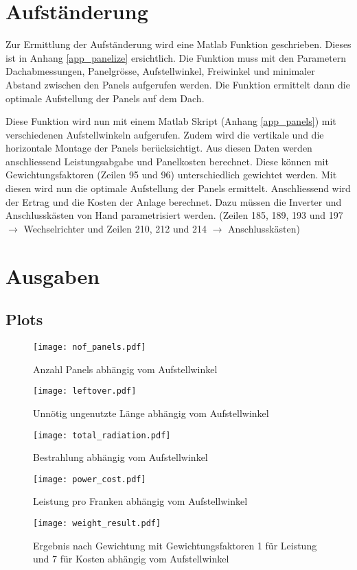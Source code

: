 \documentclass[a4,paper,fleqn]{article}
\begin{document}
\section{Aufständerung}
Zur Ermittlung der Aufständerung wird eine Matlab Funktion geschrieben. Dieses 
ist in Anhang \ref{app_panelize} ersichtlich. Die Funktion muss mit den 
Parametern Dachabmessungen, Panelgrösse, Aufstellwinkel, Freiwinkel und 
minimaler Abstand zwischen den Panels aufgerufen werden. Die Funktion 
ermittelt dann die optimale Aufstellung der Panels auf dem Dach. 

\noindent
Diese Funktion wird nun mit einem Matlab Skript (Anhang \ref{app_panels}) mit 
verschiedenen Aufstellwinkeln aufgerufen. Zudem wird die vertikale und die 
horizontale Montage der Panels berücksichtigt. Aus diesen Daten werden 
anschliessend Leistungsabgabe und Panelkosten berechnet. Diese können mit 
Gewichtungsfaktoren (Zeilen 95 und 96) unterschiedlich gewichtet werden. Mit 
diesen wird nun die optimale Aufstellung der Panels ermittelt. Anschliessend 
wird der Ertrag und die Kosten der Anlage berechnet. Dazu müssen die Inverter 
und Anschlusskästen von Hand parametrisiert werden. (Zeilen 185, 189, 193 und 
197 $\to$ Wechselrichter und Zeilen 210, 212 und 214 $\to$ Anschlusskästen)

\section{Ausgaben}
\subsection{Plots}
\begin{figure}[h!]
    \centering
    \texttt{[image: nof\_panels.pdf]}
    \label{fig:nof_panels}
    \caption{Anzahl Panels abhängig vom Aufstellwinkel}
\end{figure}
\begin{figure}[h!]
    \centering
    \texttt{[image: leftover.pdf]}
    \label{fig:leftover}
    \caption{Unnötig ungenutzte Länge abhängig vom Aufstellwinkel}
\end{figure}
\begin{figure}[h!]
    \centering
    \texttt{[image: total\_radiation.pdf]}
    \label{fig:total_radiation}
    \caption{Bestrahlung abhängig vom Aufstellwinkel}
\end{figure}
\begin{figure}[h!]
    \centering
    \texttt{[image: power\_cost.pdf]}
    \label{fig:power_cost}
    \caption{Leistung pro Franken abhängig vom Aufstellwinkel}
\end{figure}
\begin{figure}[h!]
    \centering
    \texttt{[image: weight\_result.pdf]}
    \label{fig:weight_result}
    \caption{Ergebnis nach Gewichtung mit Gewichtungsfaktoren 1 für Leistung 
        und 7 für Kosten abhängig vom Aufstellwinkel}
\end{figure}
\end{document}
